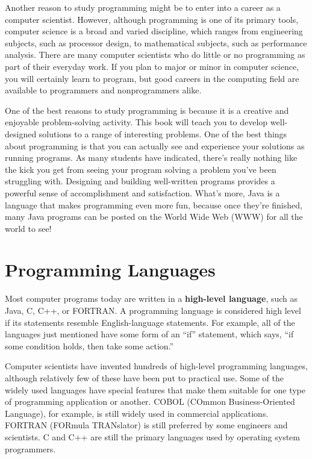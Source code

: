 Another reason to study programming might be to enter into a career as
a computer scientist.  However, although programming is one of its
primary tools, computer science is a broad and varied discipline,
which ranges from engineering subjects, such as processor design, to
mathematical subjects, such as performance analysis.  There are many
computer scientists who do little or no programming as part of their
everyday work.  If you plan to major or minor in computer science, you
will certainly learn to program, but good careers in the computing
field are available to programmers and nonprogrammers alike.

One of the best reasons to study programming is because it is a
creative and enjoyable problem-solving activity.  This book will teach
you to develop well-designed solutions to a range of interesting
problems.  One of the best things about programming is that you can
actually see and experience your solutions as running programs.  As
many students have indicated, there's really nothing like the kick you
get from seeing your program solving a problem you've been struggling
with.  Designing and building well-written programs provides a
powerful sense of accomplishment and satisfaction.  What's more, Java
is a language that makes programming even more fun, because once
they're finished, many Java programs can be posted on the World Wide
Web (WWW) for all the world to see!



\section{Programming Languages}
\label{programming-languages}
\noindent Most computer programs today are written in a {\bf high-level
language}, such as Java, C, C++, or
FORTRAN. A programming language is considered high level if its
statements resemble English-language statements.  For example, all of
the languages just mentioned have some form of an ``if'' statement,
which says, ``if some condition holds, then take some action.''

Computer scientists have invented hundreds of high-level programming
languages, although relatively few of these have been put to practical
use.  Some of the widely used languages have special features that
make them suitable for one type of programming application or another.
COBOL (COmmon Business-Oriented Language), for example, is still
widely used in commercial applications.  FORTRAN (FORmula TRANslator)
is still preferred by some engineers and scientists.  C and C++ are
still the primary languages used by operating system programmers.

